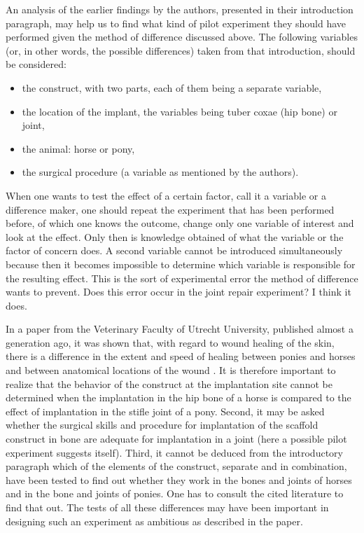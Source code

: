 \documentclass[twocolumn, reflection, authordate, serif, seplic]{jote-article}
\begin{document}
An analysis of the earlier findings by the authors, presented in their introduction paragraph, may help us to find what kind of pilot experiment they should have performed given the method of difference discussed above. The following variables (or, in other words, the possible differences) taken from that introduction, should be considered:

\begin{itemize}
\item   the construct, with two parts, each of them being a separate variable, \item   the location of the implant, the variables being tuber coxae (hip   bone) or joint, \item   the animal: horse or pony, \item   the surgical procedure (a variable as mentioned by the authors). \end{itemize}

When one wants to test the effect of a certain factor, call it a variable or a difference maker, one should repeat the experiment that has been performed before, of which one knows the outcome, change only one variable of interest and look at the effect. Only then is knowledge obtained of what the variable or the factor of concern does. A second variable cannot be introduced simultaneously because then it becomes impossible to determine which variable is responsible for the resulting effect. This is the sort of experimental error the method of difference wants to prevent. Does this error occur in the joint repair experiment? I think it does.

In a paper from the Veterinary Faculty of Utrecht University, published almost a generation ago, it was shown that, with regard to wound healing of the skin, there is a difference in the extent and speed of healing between ponies and horses and between anatomical locations of the wound \parencite{Wilmink1999}. It is therefore important to realize that the behavior of the construct at the implantation site cannot be determined when the implantation in the hip bone of a horse is compared to the effect of implantation in the stifle joint of a pony. Second, it may be asked whether the surgical skills and procedure for implantation of the scaffold construct in bone are adequate for implantation in a joint (here a possible pilot experiment suggests itself). Third, it cannot be deduced from the introductory paragraph which of the elements of the construct, separate and in combination, have been tested to find out whether they work in the bones and joints of horses and in the bone and joints of ponies. One has to consult the cited literature to find that out. The tests of all these differences may have been important in designing such an experiment as ambitious as described in the paper.
\end{document}
